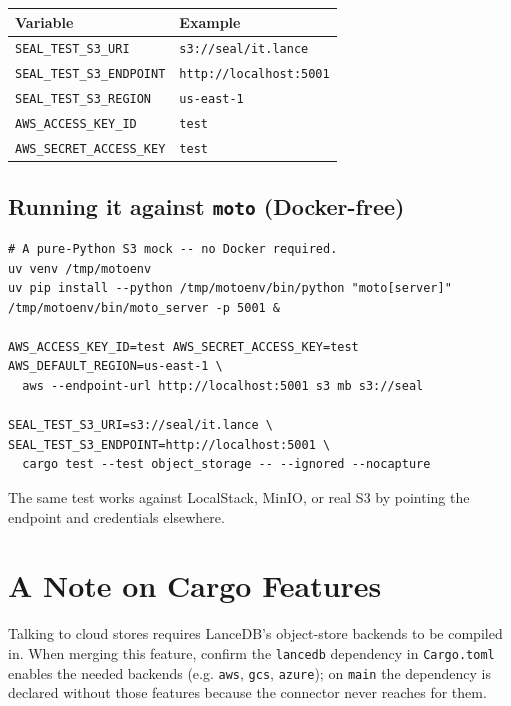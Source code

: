 \begin{center}
\begin{tabular}{@{}ll@{}}
\toprule
\textbf{Variable} & \textbf{Example} \\
\midrule
\verb|SEAL_TEST_S3_URI| & \verb|s3://seal/it.lance| \\
\verb|SEAL_TEST_S3_ENDPOINT| & \verb|http://localhost:5001| \\
\verb|SEAL_TEST_S3_REGION| & \verb|us-east-1| \\
\verb|AWS_ACCESS_KEY_ID| & \verb|test| \\
\verb|AWS_SECRET_ACCESS_KEY| & \verb|test| \\
\bottomrule
\end{tabular}
\end{center}

\subsection*{Running it against \texttt{moto} (Docker-free)}

\begin{lstlisting}
# A pure-Python S3 mock -- no Docker required.
uv venv /tmp/motoenv
uv pip install --python /tmp/motoenv/bin/python "moto[server]"
/tmp/motoenv/bin/moto_server -p 5001 &

AWS_ACCESS_KEY_ID=test AWS_SECRET_ACCESS_KEY=test AWS_DEFAULT_REGION=us-east-1 \
  aws --endpoint-url http://localhost:5001 s3 mb s3://seal

SEAL_TEST_S3_URI=s3://seal/it.lance \
SEAL_TEST_S3_ENDPOINT=http://localhost:5001 \
  cargo test --test object_storage -- --ignored --nocapture
\end{lstlisting}

The same test works against LocalStack, MinIO, or real S3 by pointing the
endpoint and credentials elsewhere.

\section{A Note on Cargo Features}

Talking to cloud stores requires LanceDB's object-store backends to be compiled
in. When merging this feature, confirm the \verb|lancedb| dependency in
\verb|Cargo.toml| enables the needed backends (e.g. \verb|aws|, \verb|gcs|,
\verb|azure|); on \verb|main| the dependency is declared without those features
because the connector never reaches for them.
